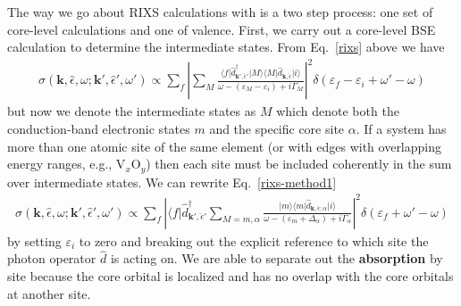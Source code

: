 \documentclass[11pt]{report}
\begin{document}
The way we go about RIXS calculations with  is a two step process: one set of core-level calculations and one of valence. First, we carry out a core-level BSE calculation to determine the intermediate states.
From Eq.~\ref{rixs} above we have
\begin{align}
\sigma( \mathbf{k}, \hat{\epsilon}, \omega; \mathbf{k}', \hat{\epsilon}', \omega' )
\propto \sum_f \left| \sum_M \frac{ \langle f \vert \hat{d}^\dagger_{\mathbf{k}', \hat{\epsilon}'} \vert M \rangle \langle M \vert \hat{d}_{\mathbf{k}, \hat{\epsilon}} \vert i \rangle}{\omega - (\varepsilon_M - \varepsilon_i) + i\Gamma_M} \right|^2 \delta( \varepsilon_f - \varepsilon_i + \omega'-\omega)
\label{rixs-method1}
\end{align}
but now we denote the intermediate states as $M$ which denote both the conduction-band electronic states $m$ and the specific core site $\alpha$.
If a system has more than one atomic site of the same element (or with edges with overlapping energy ranges, e.g., V$_x$O$_y$) then each site must be included coherently in the sum over intermediate states. 
We can rewrite Eq.~\ref{rixs-method1}
\begin{align}
\sigma( \mathbf{k}, \hat{\epsilon}, \omega; \mathbf{k}', \hat{\epsilon}', \omega' )
\propto \sum_f \left|  \langle f \vert \hat{d}^\dagger_{\mathbf{k}', \hat{\epsilon}'} \sum_{M=m,\alpha} \frac{ \vert m \rangle \langle m \vert \hat{d}_{\mathbf{k}, \hat{\epsilon};\alpha} \vert i \rangle}{\omega - (\varepsilon_m +\Delta_\alpha) + i\Gamma_{\alpha}} \right|^2 \delta( \varepsilon_f  + \omega'-\omega)
\label{rixs-method2}
\end{align}
by setting $\varepsilon_i$ to zero and breaking out the explicit reference to which site the photon operator $\hat{d}$ is acting on. 
We are able to separate out the {\bf absorption} by site because the core orbital is localized and has no overlap with the core orbitals at another site. 
\end{document}
